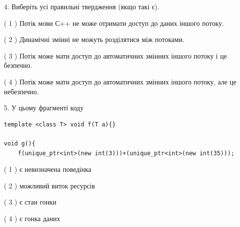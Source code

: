 \documentclass[12pt, ukrainian]{article}
\begin{document}
\begin {large}
{%
4. Виберіть усі правильні твердження (якщо такі є).\par
\vspace{2mm}

( 1 ) Потік мови С++ не може отримати доступ до даних іншого потоку.%

( 2 ) Динамічні змінні не можуть розділятися між потоками.%

( 3 ) Потік може мати доступ до автоматичних змінних іншого потоку і це безпечно.%

( 4 ) Потік може мати доступ до автоматичних змінних іншого потоку, але це небезпечно.%


5. У цьому фрагменті коду
\begin{verbatim}
template <class T> void f(T a){}

void g(){
    f(unique_ptr<int>(new int(3)))+(unique_ptr<int>(new int(35)));
\end{verbatim}

( 1 ) є невизначена поведінка%

( 2 ) можливий виток ресурсів%

( 3 ) є стан гонки%

( 4 ) є гонка даних%
}
\end {large}
\end{document}
